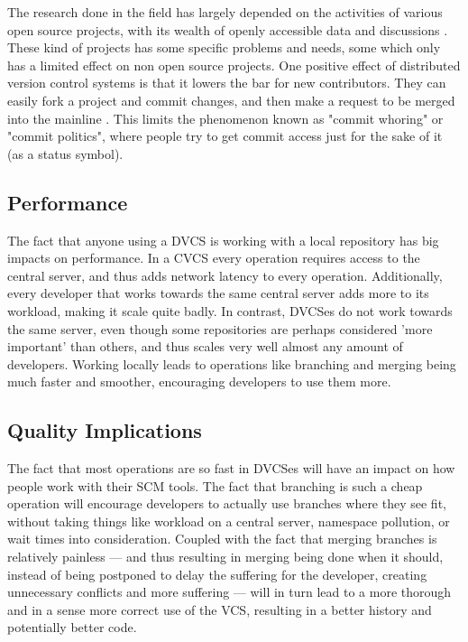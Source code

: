 \documentclass{llncs}
\begin{document}
The research done in the field has largely depended on the activities
of various open source projects, with its wealth of openly accessible
data and discussions \cite{alwis09}\cite{bird09}. These kind of
projects has some specific problems and needs, some which only has a
limited effect on non open source projects. One positive effect of
distributed version control systems is that it lowers the bar for new
contributors. They can easily fork a project and commit changes, and
then make a request to be merged into the mainline \cite{alwis09}.
This limits the phenomenon known as "commit whoring" or "commit
politics", where people try to get commit access just for the sake of
it (as a status symbol).

\subsection{Performance}

The fact that anyone using a DVCS is working with a local repository
has big impacts on performance. In a CVCS every operation requires
access to the central server, and thus adds network latency to every
operation. Additionally, every developer that works towards the same
central server adds more to its workload, making it scale quite
badly. In contrast, DVCSes do not work towards the same server, even
though some repositories are perhaps considered 'more important' than
others, and thus scales very well almost any amount of
developers. Working locally leads to operations like branching and
merging being much faster and smoother, encouraging developers to use
them more\cite{alwis09}.

\subsection{Quality Implications}

The fact that most operations are so fast in DVCSes will have an
impact on how people work with their SCM tools. The fact that
branching is such a cheap operation will encourage developers to
actually use branches where they see fit, without taking things like
workload on a central server, namespace pollution, or wait times into
consideration. Coupled with the fact that merging branches is
relatively painless --- and thus resulting in merging being done when it
should, instead of being postponed to delay the suffering for the
developer, creating unnecessary conflicts and more suffering --- will
in turn lead to a more thorough and in a sense more correct use of the
VCS, resulting in a better history and potentially better code.
\end{document}
